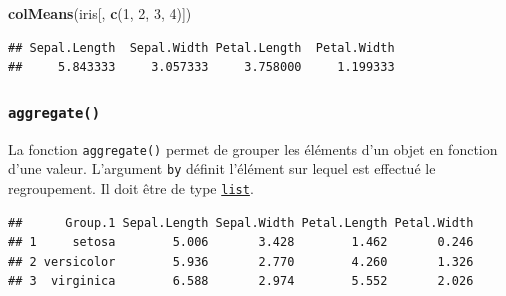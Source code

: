 \documentclass[]{book}
\newenvironment{Shaded}{\begin{snugshade}}{\end{snugshade}}
\newcommand{\DataTypeTok}[1]{\textcolor[rgb]{0.13,0.29,0.53}{#1}}
\newcommand{\DecValTok}[1]{\textcolor[rgb]{0.00,0.00,0.81}{#1}}
\newcommand{\KeywordTok}[1]{\textcolor[rgb]{0.13,0.29,0.53}{\textbf{#1}}}
\newcommand{\NormalTok}[1]{#1}
\newcommand{\OperatorTok}[1]{\textcolor[rgb]{0.81,0.36,0.00}{\textbf{#1}}}
\begin{document}
\begin{Shaded}
\begin{Highlighting}[]
\KeywordTok{colMeans}\NormalTok{(iris[, }\KeywordTok{c}\NormalTok{(}\DecValTok{1}\NormalTok{, }\DecValTok{2}\NormalTok{, }\DecValTok{3}\NormalTok{, }\DecValTok{4}\NormalTok{)])}
\end{Highlighting}
\end{Shaded}

\begin{verbatim}
## Sepal.Length  Sepal.Width Petal.Length  Petal.Width 
##     5.843333     3.057333     3.758000     1.199333
\end{verbatim}

\hypertarget{l015aggregate}{%
\subsubsection{\texorpdfstring{\texttt{aggregate()}}{aggregate()}}\label{l015aggregate}}

La fonction \texttt{aggregate()} permet de grouper les éléments d'un objet en fonction d'une valeur. L'argument \texttt{by} définit l'élément sur lequel est effectué le regroupement. Il doit être de type \protect\hyperlink{l014list}{\texttt{list}}.

\begin{Shaded}
\end{Shaded}

\begin{verbatim}
##      Group.1 Sepal.Length Sepal.Width Petal.Length Petal.Width
## 1     setosa        5.006       3.428        1.462       0.246
## 2 versicolor        5.936       2.770        4.260       1.326
## 3  virginica        6.588       2.974        5.552       2.026
\end{verbatim}

\begin{Shaded}
\end{Shaded}
\end{document}
